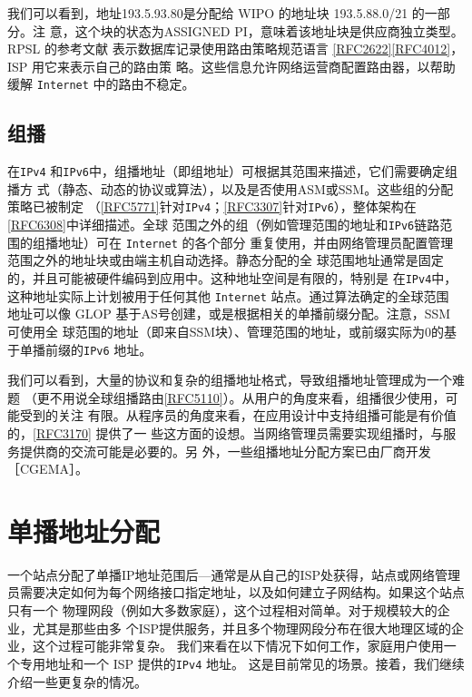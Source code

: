 我们可以看到，地址193.5.93.80是分配给 WIPO 的地址块 193.5.88.0/21 的一部分。注
意，这个块的状态为ASSIGNED PI，意味着该地址块是供应商独立类型。RPSL 的参考文献
表示数据库记录使用路由策略规范语言 \href{https://www.rfc-editor.org/rfc/rfc2622}{[RFC2622]}\href{https://www.rfc-editor.org/rfc/rfc4012}{[RFC4012]}，ISP 用它来表示自己的路由策
略。这些信息允许网络运营商配置路由器，以帮助缓解 \verb|Internet| 中的路由不稳定。

\subsection{组播}
在\verb|IPv4| 和\verb|IPv6|中，组播地址（即组地址）可根据其范围来描述，它们需要确定组播方
式（静态、动态的协议或算法），以及是否使用ASM或SSM。这些组的分配策略已被制定
（\href{https://www.rfc-editor.org/rfc/rfc5771}{[RFC5771]}针对\verb|IPv4|；\href{https://www.rfc-editor.org/rfc/rfc3307}{[RFC3307]}针对\verb|IPv6|），整体架构在\href{https://www.rfc-editor.org/rfc/rfc6308}{[RFC6308]}中详细描述。全球
范围之外的组（例如管理范围的地址和\verb|IPv6|链路范围的组播地址）可在 \verb|Internet| 的各个部分
重复使用，并由网络管理员配置管理范围之外的地址块或由端主机自动选择。静态分配的全
球范围地址通常是固定的，并且可能被硬件编码到应用中。这种地址空间是有限的，特别是
在\verb|IPv4|中，这种地址实际上计划被用于任何其他 \verb|Internet| 站点。通过算法确定的全球范围
地址可以像 GLOP 基于AS号创建，或是根据相关的单播前缀分配。注意，SSM 可使用全
球范围的地址（即来自SSM块）、管理范围的地址，或前缀实际为0的基于单播前缀的\verb|IPv6|
地址。

我们可以看到，大量的协议和复杂的组播地址格式，导致组播地址管理成为一个难题
（更不用说全球组播路由\href{https://www.rfc-editor.org/rfc/rfc5110}{[RFC5110]}）。从用户的角度来看，组播很少使用，可能受到的关注
有限。从程序员的角度来看，在应用设计中支持组播可能是有价值的，\href{https://www.rfc-editor.org/rfc/rfc3170}{[RFC3170]} 提供了一
些这方面的设想。当网络管理员需要实现组播时，与服务提供商的交流可能是必要的。另
外，一些组播地址分配方案已由厂商开发［CGEMA］。

\section{单播地址分配}
一个站点分配了单播IP地址范围后—通常是从自己的ISP处获得，站点或网络管理
员需要决定如何为每个网络接口指定地址，以及如何建立子网结构。如果这个站点只有一个
物理网段（例如大多数家庭），这个过程相对简单。对于规模较大的企业，尤其是那些由多
个ISP提供服务，并且多个物理网段分布在很大地理区域的企业，这个过程可能非常复杂。
我们来看在以下情况下如何工作，家庭用户使用一个专用地址和一个 ISP 提供的\verb|IPv4| 地址。
这是目前常见的场景。接着，我们继续介绍一些更复杂的情况。

